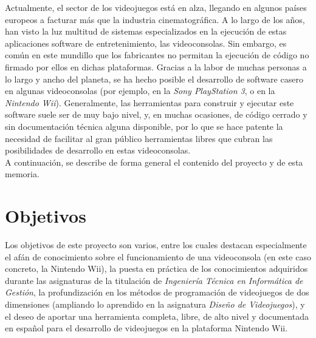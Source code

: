



Actualmente, el sector de los videojuegos está en alza, llegando en algunos países europeos a facturar más que la industria cinematográfica. A lo largo de los años, han visto la luz multitud de sistemas especializados en la ejecución de estas aplicaciones software de entretenimiento, las videoconsolas. Sin embargo, es común en este mundillo que los fabricantes no permitan la ejecución de código no firmado por ellos en dichas plataformas. Gracias a la labor de muchas personas a lo largo y ancho del planeta, se ha hecho posible el desarrollo de software casero en algunas videoconsolas (por ejemplo, en la \emph{Sony PlayStation 3}, o en la \emph{Nintendo Wii}). Generalmente, las herramientas para construir y ejecutar este software suele ser de muy bajo nivel, y, en muchas ocasiones, de código cerrado y sin documentación técnica alguna disponible, por lo que se hace patente la necesidad de facilitar al gran público herramientas libres que cubran las posibilidades de desarrollo en estas videoconsolas.\\

A continuación, se describe de forma general el contenido del proyecto y de esta memoria.

\section{Objetivos}

Los objetivos de este proyecto son varios, entre los cuales destacan especialmente el afán de conocimiento sobre el funcionamiento de una videoconsola (en este caso concreto, la Nintendo Wii), la puesta en práctica de los conocimientos adquiridos durante las asignaturas de la titulación de \emph{Ingeniería Técnica en Informática de Gestión}, la profundización en los métodos de programación de videojuegos de dos dimensiones (ampliando lo aprendido en la asignatura \emph{Diseño de Videojuegos}), y el deseo de aportar una herramienta completa, libre, de alto nivel y documentada en español para el desarrollo de videojuegos en la plataforma Nintendo Wii.\\

